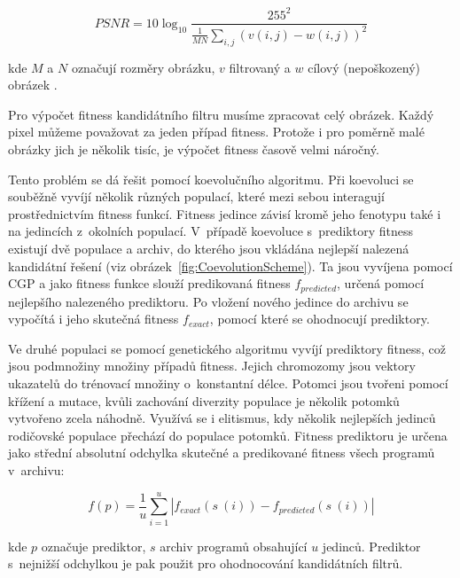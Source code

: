 \documentclass[fleqn,11pt]{ExcelAtFIT} %
\begin{document}
\begin{equation}
    \label{eq:PSNR}
    \mathit{PSNR} = 10 \log_{10} \frac{255^2}{\frac{1}{MN} \sum\limits_{i,j} \left( v\left( i, j \right) - w\left( i, j \right)  \right)^2 }
\end{equation}

\noindent{}kde $M$ a $N$ označují rozměry obrázku, $v$ filtrovaný a $w$ cílový (nepoškozený) obrázek \cite{ZelenaIF}.

Pro výpočet fitness kandidátního filtru musíme zpracovat celý obrázek. Každý pixel můžeme považovat za jeden případ fitness. Protože i pro poměrně malé obrázky jich je několik tisíc, je výpočet fitness časově velmi náročný.

Tento problém se dá řešit pomocí koevolučního algoritmu. Při koevoluci se souběžně vyvíjí několik různých populací, které mezi sebou interagují prostřednictvím fitness funkcí. Fitness jedince závisí kromě jeho fenotypu také i na jedincích z~okolních populací. V~případě koevoluce s~prediktory fitness existují dvě populace a archiv, do kterého jsou vkládána nej\-lep\-ší nalezená kandidátní řešení (viz obrázek~\ref{fig:CoevolutionScheme}). Ta jsou vyvíjena pomocí CGP a jako fitness funkce slouží predikovaná fitness $f_{\mathit{predicted}}$, určená pomocí nejlepšího nalezeného prediktoru. Po vložení nového jedince do archivu se vypočítá i jeho skutečná fitness $f_{\mathit{exact}}$, pomocí které se ohodnocují prediktory.

Ve druhé populaci se pomocí genetického algoritmu vyvíjí prediktory fitness, což jsou pod\-mno\-žiny množiny případů fitness. Jejich chromozomy jsou vek\-tory ukazatelů do trénovací množiny o~konstantní délce. Potomci jsou tvořeni pomocí křížení a mutace, kvůli zachování diverzity populace je několik potomků vytvořeno zcela náhodně. Využívá se i eli\-tis\-mus, kdy několik nejlepších jedinců rodičovské populace přechází do populace potomků. Fitness prediktoru je určena jako střední absolutní odchylka skutečné a predikované fitness všech programů v~archivu:

\begin{equation}
    \label{eq:fitnessPredictor}
    f \left( p \right) = \frac{1}{u} \sum\limits_{i=1}^{u} \left| f_{\mathit{exact}} \left( s~\left( i \right) \right) - f_{\mathit{predicted}} \left( s~\left( i \right) \right) \right|
\end{equation}

\noindent{}kde $p$ označuje prediktor, $s$ archiv programů obsahující $u$ jedinců. Prediktor s~nejnižší odchylkou je pak použit pro ohodnocování kandidátních filtrů.
\end{document}
